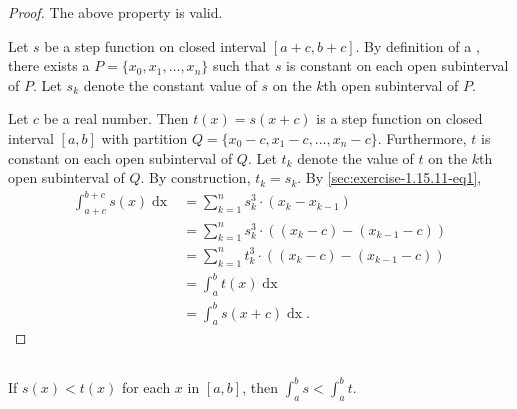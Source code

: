 \documentclass{report}
\begin{document}
\begin{proof}

  The above property is valid.

  \divider

  Let $s$ be a step function on closed interval $[a + c, b + c]$.
  By definition of a , there exists a  $P = \{x_0, x_1, \ldots, x_n\}$ such that $s$ is constant on each open subinterval of $P$.
  Let $s_k$ denote the constant value of $s$ on the $k$th open subinterval of $P$.

  Let $c$ be a real number.
  Then $t(x) = s(x + c)$ is a step function on closed interval $[a, b]$ with partition $Q = \{x_0 - c, x_1 - c, \ldots, x_n - c\}$.
  Furthermore, $t$ is constant on each open subinterval of $Q$.
  Let $t_k$ denote the value of $t$ on the $k$th open subinterval of $Q$.
  By construction, $t_k = s_k$.
  By \eqref{sec:exercise-1.15.11-eq1},
    \begin{align*}
      \int_{a+c}^{b+c} s(x) \mathop{dx}
        & = \sum_{k=1}^n s_k^3 \cdot (x_k - x_{k-1}) \\
        & = \sum_{k=1}^n s_k^3 \cdot ((x_k - c) - (x_{k-1} - c)) \\
        & = \sum_{k=1}^n t_k^3 \cdot ((x_k - c) - (x_{k-1} - c)) \\
        & = \int_a^b t(x) \mathop{dx} \\
        & = \int_a^b s(x + c) \mathop{dx}.
    \end{align*}

\end{proof}

\subsection{}%
\label{sub:exercise-1.15.11e}

If $s(x) < t(x)$ for each $x$ in $[a, b]$, then $\int_a^b s < \int_a^b t$.

\end{document}
